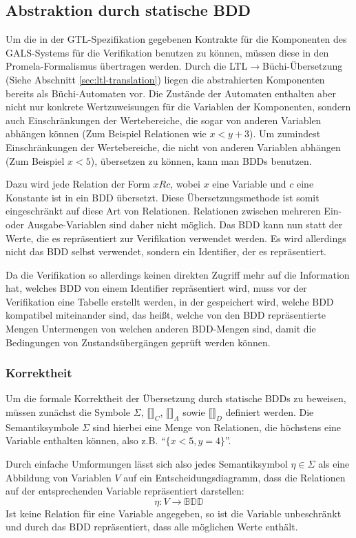 \subsection{Abstraktion durch statische BDD}
Um die in der GTL-Spezifikation gegebenen Kontrakte für die Komponenten des GALS-Systems für die Verifikation benutzen zu können, müssen diese in den Promela-Formalismus übertragen werden.
Durch die LTL$\rightarrow$Büchi-Übersetzung (Siehe Abschnitt \ref{sec:ltl-translation}) liegen die abstrahierten Komponenten bereits als Büchi-Automaten vor.
Die Zustände der Automaten enthalten aber nicht nur konkrete Wertzuweisungen für die Variablen der Komponenten, sondern auch Einschränkungen der Wertebereiche, die sogar von anderen Variablen abhängen können (Zum Beispiel Relationen wie $x < y + 3$).
Um zumindest Einschränkungen der Wertebereiche, die nicht von anderen Variablen abhängen (Zum Beispiel $x < 5$), übersetzen zu können, kann man BDDs benutzen.

Dazu wird jede Relation der Form $x R c$, wobei $x$ eine Variable und $c$ eine Konstante ist in ein BDD übersetzt.
Diese Übersetzungsmethode ist somit eingeschränkt auf diese Art von Relationen.
Relationen zwischen mehreren Ein- oder Ausgabe-Variablen sind daher nicht möglich.
Das BDD kann nun statt der Werte, die es repräsentiert zur Verifikation verwendet werden.
Es wird allerdings nicht das BDD selbst verwendet, sondern ein Identifier, der es repräsentiert.

Da die Verifikation so allerdings keinen direkten Zugriff mehr auf die Information hat, welches BDD von einem Identifier repräsentiert wird, muss vor der Verifikation eine Tabelle erstellt werden, in der gespeichert wird, welche BDD kompatibel miteinander sind, das heißt, welche von den BDD repräsentierte Mengen Untermengen von welchen anderen BDD-Mengen sind, damit die Bedingungen von Zustandsübergängen geprüft werden können.
\subsubsection{Korrektheit}
Um die formale Korrektheit der Übersetzung durch statische BDDs zu beweisen, müssen zunächst die Symbole $\Sigma$, $\llbracket\rrbracket_C$, $\llbracket\rrbracket_A$ sowie $\llbracket\rrbracket_D$ definiert werden.
Die Semantiksymbole $\Sigma$ sind hierbei eine Menge von Relationen, die höchstens eine Variable enthalten können, also z.B. "`$\{x<5,y=4\}$"'.

Durch einfache Umformungen lässt sich also jedes Semantiksymbol $\eta\in\Sigma$ als eine Abbildung von Variablen $V$ auf ein Entscheidungsdiagramm, dass die Relationen auf der entsprechenden Variable repräsentiert darstellen:
\[ \eta : V\rightarrow \mathbb{BDD} \]
Ist keine Relation für eine Variable angegeben, so ist die Variable unbeschränkt und durch das BDD repräsentiert, dass alle möglichen Werte enthält.

